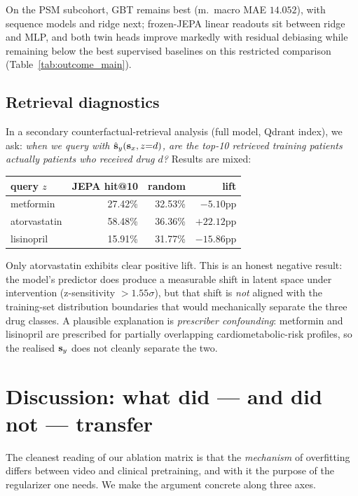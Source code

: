 On the PSM subcohort, GBT remains best (m.\ macro MAE $14.052$), with
sequence models and ridge next; frozen-JEPA linear readouts sit between
ridge and MLP, and both twin heads improve markedly with residual
debiasing while remaining below the best supervised baselines on this
restricted comparison (Table~\ref{tab:outcome_main}).

\subsection{Retrieval diagnostics}

In a secondary counterfactual-retrieval analysis (full model, Qdrant
index), we ask: \emph{when we query with $\hat{\mathbf{s}}_y(\mathbf{s}_x, z{=}d)$, are the
top-10 retrieved training patients actually patients who received drug
$d$?} Results are mixed:

\begin{center}\small
\begin{tabular}{lrrr}
\toprule
query $z$     & JEPA hit@10 & random & lift \\
\midrule
metformin     & 27.42\%      & 32.53\% & $-5.10$pp \\
atorvastatin  & 58.48\%      & 36.36\% & $+22.12$pp \\
lisinopril    & 15.91\%      & 31.77\% & $-15.86$pp \\
\bottomrule
\end{tabular}
\end{center}

Only atorvastatin exhibits clear positive lift. This is an honest
negative result: the model's predictor does produce a measurable shift
in latent space under intervention (z-sensitivity $> 1.55\sigma$), but
that shift is \emph{not} aligned with the training-set distribution
boundaries that would mechanically separate the three drug classes.
A plausible explanation is \emph{prescriber confounding}: metformin and
lisinopril are prescribed for partially overlapping
cardiometabolic-risk profiles, so the realised $\mathbf{s}_y$ does not cleanly
separate the two.

\section{Discussion: what did --- and did not --- transfer}
\label{sec:discussion}

The cleanest reading of our ablation matrix is that the \emph{mechanism}
of overfitting differs between video and clinical pretraining, and with
it the purpose of the regularizer one needs. We make the argument
concrete along three axes.

